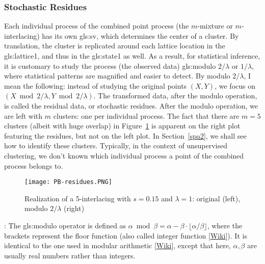 \documentclass[10pt]{article}
\begin{document}
\subsubsection{Stochastic Residues} \label{sr40}

Each individual process of the  combined point process (the $m$-mixture or $m$-interlacing) has its own 
\gls{gls:sv}, which determines the center of a cluster. By translation, the cluster is replicated around each lattice location
in the \gls{gls:lattice1}, and thus in the \gls{gls:state1} as well. As a result, for statistical inference, it is customary to study the
process (the observed data) \gls{gls:modulo} $2/\lambda$ or $1/\lambda$, where statistical patterns are magnified and easier to detect. By modulo $2/\lambda$, I mean the following:  instead of
studying the original points $(X,Y)$, we focus on $(X\bmod 2/\lambda,Y\bmod 2/\lambda)$. The transformed data, after the modulo operation, is called the residual data, or 
\textcolor{index}{stochastic residues}.
After the modulo operation, we are left with $m$ clusters: one per individual process.  The fact that there are $m=5$ clusters (albeit with huge overlap) in Figure~\ref{fig:residues} is apparent on the right plot featuring the residues, but not on the left plot. In Section~\ref{spa2}, we shall see how to identify these clusters. Typically, in the context of unsupervised clustering, we don't known which individual process a point of the combined process belongs to. 

\begin{figure}%
\centering
\texttt{[image: PB-residues.PNG]}
\caption{Realization of a 5-interlacing with $s=0.15$ and $\lambda=1$: original (left), modulo $2/\lambda$ (right)}
\label{fig:residues}
\end{figure}

: The \gls{gls:modulo} operator is defined as  $\alpha \bmod{\beta} =\alpha-\beta \cdot \lfloor \alpha/\beta\rfloor$, 
where the brackets represent the floor function (also called integer function [\href{https://en.wikipedia.org/wiki/Floor_and_ceiling_functions}{Wiki}]). It is identical to the one used in modular arithmetic [\href{https://en.wikipedia.org/wiki/Modular_arithmetic}{Wiki}], except that here, $\alpha,\beta$ are usually real numbers rather than integers. 
\end{document}
